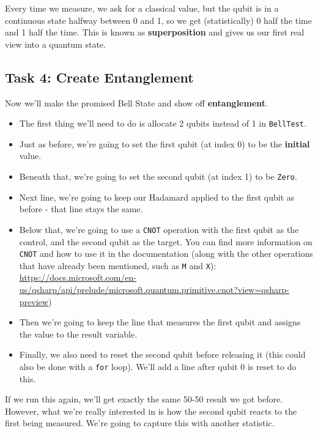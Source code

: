 \documentclass[a4paper]{article}
\begin{document}
Every time we measure, we ask for a classical value, but the qubit is in a continuous state halfway between 0 and 1, so we get (statistically) 0 half the time and 1 half the time. This is known as \textbf{superposition} and gives us our first real view into a quantum state.

\subsection{Task 4: Create Entanglement}
Now we'll make the promised Bell State and show off \textbf{entanglement}. 

\begin{itemize}
\item The first thing we'll need to do is allocate 2 qubits instead of 1 in \verb$BellTest$.
\item Just as before, we're going to set the first qubit (at index 0) to be the \textbf{initial} value.
\item Beneath that, we're going to set the second qubit (at index 1) to be \verb$Zero$. 
\item Next line, we're going to keep our Hadamard applied to the first qubit as before - that line stays the same.
\item Below that, we're going to use a \verb$CNOT$ operation with the first qubit as the control, and the second qubit as the target. You can find more information on \verb$CNOT$ and how to use it in the documentation (along with the other operations that have already been mentioned, such as \verb$M$ and \verb$X$): \url{https://docs.microsoft.com/en-us/qsharp/api/prelude/microsoft.quantum.primitive.cnot?view=qsharp-preview})
\item Then we're going to keep the line that measures the first qubit and assigns the value to the result variable.
\item Finally, we also need to reset the second qubit before releasing it (this could also be done with a \verb$for$ loop). We'll add a line after qubit 0 is reset to do this.
\end{itemize}

If we run this again, we'll get exactly the same 50-50 result we got before. However, what we're really interested in is how the second qubit reacts to the first being measured. We're going to capture this with another statistic.
\end{document}
